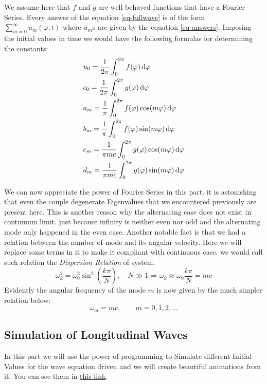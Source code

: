 \documentclass[final,5p,times,twocolumn,authoryear]{elsarticle}
\begin{document}
We assume here that $f$ and $g$ are well-behaved functions that have a Fourier Series. Every answer of the equation \ref{eq-fullwave} is of the form $\sum_{m=0}^{\infty} u_m(\varphi,t)$ where $u_m$s are given by the equation \ref{eq-answers}. Imposing the initial values in time we would have the following formulas for determining the constants:
\begin{equation}
	\label{eq-fouriercoeff}
	\begin{aligned}
		&u_0 = \frac{1}{2\pi}\int_{0}^{2\pi}f(\varphi)\odif{\varphi} \\
		&c_0 = \frac{1}{2\pi}\int_{0}^{2\pi}g(\varphi)\odif{\varphi} \\
		&a_m = \frac{1}{\pi}\int_{0}^{2\pi}f(\varphi)\cos(m\varphi)\odif{\varphi} \\
		&b_m = \frac{1}{\pi}\int_{0}^{2\pi}f(\varphi)\sin(m\varphi)\odif{\varphi} \\
		&c_m = \frac{1}{\pi mc}\int_{0}^{2\pi}g(\varphi)\cos(m\varphi)\odif{\varphi} \\
		&d_m = \frac{1}{\pi mc}\int_{0}^{2\pi}g(\varphi)\sin(m\varphi)\odif{\varphi} 
	\end{aligned}
\end{equation}

We can now appreciate the power of Fourier Series in this part. it is astonishing that even the couple degenerate Eigenvalues that we encountered previously are present here. This is another reason why the alternating case does not exist in continuum limit. just because infinity is neither even nor odd and the alternating mode only happened in the even case. Another notable fact is that we had a relation between the number of mode and its angular velocity. Here we will replace some terms in it to make it compliant with continuous case. we would call such relation the \textit{Dispersion Relation} of system.
\[ \omega_k^2 = \omega_0^2\sin^2\left(\frac{k\pi}{N}\right), \quad N \gg 1 \Rightarrow \omega_k \approx \omega_0 \frac{k\pi}{N} = mc \]
Evidently the angular frequency of the mode $m$ is now given by the much simpler relation below:
\begin{equation}
	\omega_m = m c ,\qquad m = 0,1,2,\dots
\end{equation}
\subsection{Simulation of Longitudinal Waves}
In this part we will use the power of programming to Simulate different Initial Values for the wave equation driven and we will create beautiful animations from it. You can see them in \href{https://github.com/a-samea/Waves-CourseProject/blob/main/Simulations/N%20Particle.ipynb}{this link}.
\end{document}

